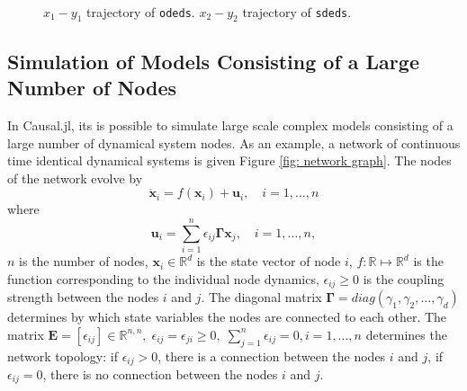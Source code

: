 \documentclass{juliacon}
\begin{document}
{\begin{figure}
    \centering
    \\
    \caption{\protect{} $x_1 - y_1$ trajectory of \texttt{odeds}. \protect{} $x_2 - y_2$ trajectory of \texttt{sdeds}.}
    \label{fig: coupled simulation results}
\end{figure}

\subsection{Simulation of Models Consisting of a Large Number of Nodes}
In Causal.jl, its is possible to simulate large scale complex models consisting of a large number of dynamical system nodes. As an example, a network of continuous time identical dynamical systems is given Figure \ref{fig: network graph}. The nodes of the network evolve by 
\begin{equation}
    \dot{\bm{x}}_i = f(\bm{x}_i) + \bm{u}_i, \quad i = 1, \ldots, n
    \label{eq: network equation}
\end{equation}
where 
\begin{equation}
    \bm{u}_i = \sum_{i = 1}^n \epsilon_{ij} \bm{\Gamma} \bm{x}_j, \quad i = 1, \ldots, n,
    \label{eq: network node inputs}
\end{equation}
$n$ is the number of nodes, $\bm{x}_i \in \mathbb{R}^d$ is the state vector of node $i$, $f: \mathbb{R} \mapsto \mathbb{R}^d$ is the function corresponding to the individual node dynamics, $\epsilon_{ij} \geq 0 $ is the coupling strength between the nodes $i$ and $j$. The diagonal matrix $\bm{\Gamma} = diag(\gamma_1, \gamma_2,  \ldots, \gamma_d)$ determines by which state variables the nodes are connected to each other. The matrix $\bm{E} = [\epsilon_{ij}] \in \mathbb{R}^{n, n}, \; \epsilon_{ij} = \epsilon_{ji} \geq 0, \; \sum_{j = 1}^n \epsilon_{ij} = 0, i = 1, \ldots, n$ determines the network topology: if $\epsilon_{ij} > 0$, there is a connection between the nodes $i$ and $j$, if $\epsilon_{ij} = 0$, there is no connection between the nodes $i$ and $j$.

}
\end{document}
